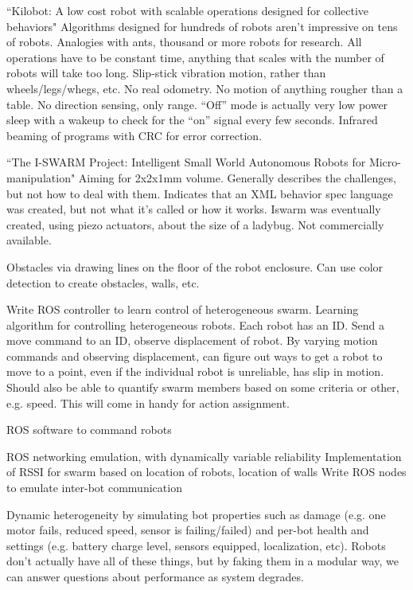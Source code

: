 \documentclass[]{article}
\begin{document}
``Kilobot: A low cost robot with scalable operations designed for collective behaviors" \cite{rubenstein2014kilobot} Algorithms designed for hundreds of robots aren't impressive on tens of robots. Analogies with ants, thousand or more robots for research. All operations have to be constant time, anything that scales with the number of robots will take too long. Slip-stick vibration motion, rather than wheels/legs/whegs, etc. No real odometry. No motion of anything rougher than a table. No direction sensing, only range. ``Off'' mode is actually very low power sleep with a wakeup to check for the ``on'' signal every few seconds. Infrared beaming of programs with CRC for error correction. 

``The I-SWARM Project: Intelligent Small World Autonomous Robots for Micro-manipulation" \cite{seyfried2005swarm} Aiming for 2x2x1mm volume. Generally describes the challenges, but not how to deal with them. Indicates that an XML behavior spec language was created, but not what it's called or how it works. Iswarm was eventually created, using piezo actuators, about the size of a ladybug. Not commercially available. 






Obstacles via drawing lines on the floor of the robot enclosure. Can use color detection to create obstacles, walls, etc. 

Write ROS controller to learn control of heterogeneous swarm.
Learning algorithm for controlling heterogeneous robots. 
Each robot has an ID. Send a move command to an ID, observe displacement of robot. 
By varying motion commands and observing displacement, can figure out ways to get a robot to move to a point, even if the individual robot is unreliable, has slip in motion. 
Should also be able to quantify swarm members based on some criteria or other, e.g. speed. This will come in handy for action assignment.

ROS software to command robots

ROS networking emulation, with dynamically variable reliability
Implementation of RSSI for swarm based on location of robots, location of walls
Write ROS nodes to emulate inter-bot communication

Dynamic heterogeneity by simulating bot properties such as damage (e.g. one motor fails, reduced speed, sensor is failing/failed) and per-bot health and settings (e.g. battery charge level, sensors equipped, localization, etc).
Robots don't actually have all of these things, but by faking them in a modular way, we can answer questions about performance as system degrades.
\end{document}
